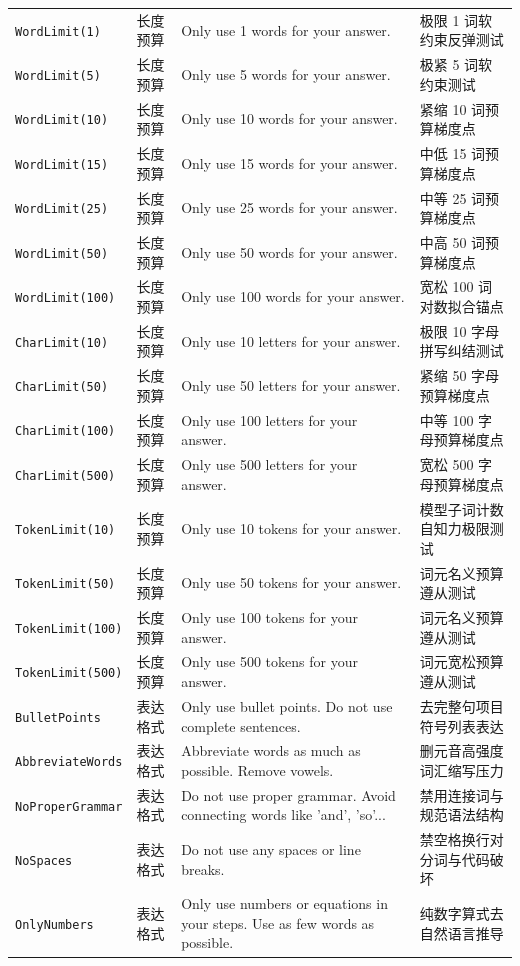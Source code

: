 {\begin{longtable}{@{}>{\raggedright\arraybackslash}p{3.0cm} >{\raggedright\arraybackslash}p{1.9cm} >{\raggedright\arraybackslash}p{5.5cm} >{\raggedright\arraybackslash}p{4.0cm}@{}}
\texttt{WordLimit(1)} & 长度预算 & Only use 1 words for your answer. & 极限 1 词软约束反弹测试 \\
\texttt{WordLimit(5)} & 长度预算 & Only use 5 words for your answer. & 极紧 5 词软约束测试 \\
\texttt{WordLimit(10)} & 长度预算 & Only use 10 words for your answer. & 紧缩 10 词预算梯度点 \\
\texttt{WordLimit(15)} & 长度预算 & Only use 15 words for your answer. & 中低 15 词预算梯度点 \\
\texttt{WordLimit(25)} & 长度预算 & Only use 25 words for your answer. & 中等 25 词预算梯度点 \\
\texttt{WordLimit(50)} & 长度预算 & Only use 50 words for your answer. & 中高 50 词预算梯度点 \\
\texttt{WordLimit(100)} & 长度预算 & Only use 100 words for your answer. & 宽松 100 词对数拟合锚点 \\
\texttt{CharLimit(10)} & 长度预算 & Only use 10 letters for your answer. & 极限 10 字母拼写纠结测试 \\
\texttt{CharLimit(50)} & 长度预算 & Only use 50 letters for your answer. & 紧缩 50 字母预算梯度点 \\
\texttt{CharLimit(100)} & 长度预算 & Only use 100 letters for your answer. & 中等 100 字母预算梯度点 \\
\texttt{CharLimit(500)} & 长度预算 & Only use 500 letters for your answer. & 宽松 500 字母预算梯度点 \\
\texttt{TokenLimit(10)} & 长度预算 & Only use 10 tokens for your answer. & 模型子词计数自知力极限测试 \\
\texttt{TokenLimit(50)} & 长度预算 & Only use 50 tokens for your answer. & 50 词元名义预算遵从测试 \\
\texttt{TokenLimit(100)} & 长度预算 & Only use 100 tokens for your answer. & 100 词元名义预算遵从测试 \\
\texttt{TokenLimit(500)} & 长度预算 & Only use 500 tokens for your answer. & 500 词元宽松预算遵从测试 \\
\texttt{BulletPoints} & 表达格式 & Only use bullet points. Do not use complete sentences. & 去完整句项目符号列表表达 \\
\texttt{AbbreviateWords} & 表达格式 & Abbreviate words as much as possible. Remove vowels. & 删元音高强度词汇缩写压力 \\
\texttt{NoProperGrammar} & 表达格式 & Do not use proper grammar. Avoid connecting words like 'and', 'so'... & 禁用连接词与规范语法结构 \\
\texttt{NoSpaces} & 表达格式 & Do not use any spaces or line breaks. & 禁空格换行对分词与代码破坏 \\
\texttt{OnlyNumbers} & 表达格式 & Only use numbers or equations in your steps. Use as few words as possible. & 纯数字算式去自然语言推导 \\
\end{longtable}}

